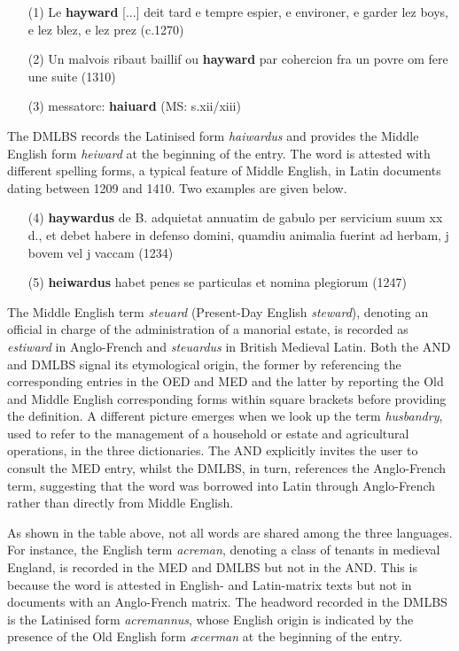 \documentclass[output=paper,colorlinks,citecolor=brown,arabicfont,chinesefont]{langscibook}
\begin{document}
\begin{itemize}
    \item [(1)] Le \textbf{hayward} [...] deit tard e tempre espier, e environer, e garder lez boys, e lez blez, e lez prez (c.1270) 
    \item [(2)] Un malvois ribaut baillif ou \textbf{hayward} par cohercion fra un povre om fere une suite (1310)
    \item [(3)] messatorc: \textbf{haiuard} (MS: s.xii/xiii)
\end{itemize}

The DMLBS records the Latinised form \emph{haiwardus} and provides the Middle English form \emph{heiward} at the beginning of the entry. The word is attested with different spelling forms, a typical feature of Middle English, in Latin documents dating between 1209 and 1410. Two examples are given below.

\begin{itemize}
    \item [(4)] \textbf{haywardus} de B. adquietat annuatim de gabulo per servicium suum xx d., et debet habere in defenso domini, quamdiu animalia fuerint ad herbam, j bovem vel j vaccam (1234)
    \item [(5)] \textbf{heiwardus} habet penes se particulas et nomina plegiorum (1247)
\end{itemize}

The Middle English term \emph{steuard} (Present-Day English \emph{steward}), denoting an official in charge of the administration of a manorial estate, is recorded as \emph{estiward} in Anglo-French and \emph{steuardus} in British Medieval Latin. Both the AND and DMLBS signal its etymological origin, the former by referencing the corresponding entries in the OED and MED and the latter by reporting the Old and Middle English corresponding forms within square brackets before providing the definition. A different picture emerges when we look up the term \emph{husbandry}, used to refer to the management of a household or estate and agricultural operations, in the three dictionaries. The AND explicitly invites the user to consult the MED entry, whilst the DMLBS, in turn, references the Anglo-French term, suggesting that the word was borrowed into Latin through Anglo-French rather than directly from Middle English.

As shown in the table above, not all words are shared among the three languages. For instance, the English term \emph{acreman}, denoting a class of tenants in medieval England, is recorded in the MED and DMLBS but not in the AND. This is because the word is attested in English- and Latin-matrix texts but not in documents with an Anglo-French matrix. The headword recorded in the DMLBS is the Latinised form \emph{acremannus}, whose English origin is indicated by the presence of the Old English form \emph{æcerman} at the beginning of the entry.
\end{document}
